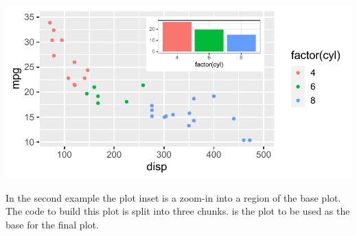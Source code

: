 \documentclass[krantz2]{krantz}\usepackage{knitr}
\begin{document}
\begin{knitrout}\footnotesize
{}\color{fgcolor}\begin{kframe}
\begin{alltt}
\hlstd{(} 
        \hlstd{=} \hlstd{(}     \hlstd{=}  \hlopt{+}
  \hlstd{()} \hlopt{+}
  \hlstd{(} 
            \hlstd{(}     
             \hlstd{=} \hlopt{/}\hlstd{,}
             \hlstd{=} \hlstd{,}  \hlstd{=} \hlstd{)}
\end{alltt}
\end{kframe}

{\centering \includegraphics[width=.7\textwidth]{figure/pos-plot-plot-02-1} 

}


\end{knitrout}

In the second example the plot inset is a zoom-in into a region of the base plot. The code to build this plot is split into three chunks.  is the plot to be used as the base for the final plot.

\begin{knitrout}\footnotesize
{}\color{fgcolor}\begin{kframe}
\begin{alltt}
 \hlkwb{<-}
  \hlstd{(} 
          \hlstd{=} \hlstd{(}     \hlstd{=}  \hlopt{+}
  \hlstd{()}
\end{alltt}
\end{kframe}
\end{knitrout}
\end{document}

